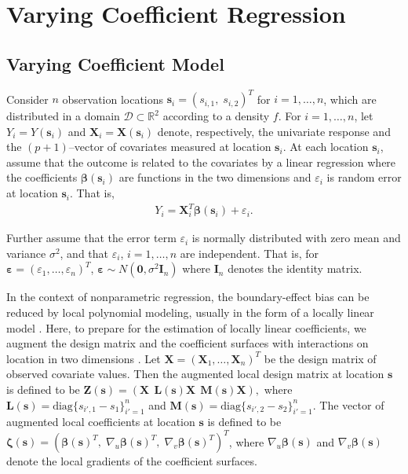 \documentclass[authoryear,review, 12pt]{elsarticle}
\begin{document}
\section{Varying Coefficient Regression\label{sec:vcr}}

\subsection{Varying Coefficient Model}

Consider $n$ observation locations $\bm{s}_{i}=(s_{i,1},\; s_{i,2})^{T}$
for $i=1,\dots,n$, which are distributed in a domain $\mathcal{D}\subset\mathbb{R}^{2}$
according to a density $f$. For $i=1,\dots,n$, let $Y_{i}=Y(\bm{s}_{i})$
and $\bm{X}_{i}=\bm{X}(\bm{s}_{i})$ denote, respectively, the univariate
response and the $(p+1)$--vector of covariates measured at location
$\bm{s}_{i}$. At each location $\bm{s}_{i}$, assume that the outcome
is related to the covariates by a linear regression where the coefficients
$\bm{\beta}(\bm{s}_{i})$ are functions in the two dimensions and
$\varepsilon_{i}$ is random error at location $\bm{s}_{i}$. That
is, 
\begin{align}
Y_{i}=\bm{X}_{i}^{T}\bm{\beta}(\bm{s}_{i})+\varepsilon_{i}.\label{eq:lm(s)}
\end{align}

Further assume that the error term $\varepsilon_{i}$ is normally
distributed with zero mean and variance $\sigma^{2}$, and that $\varepsilon_{i}$,
$i=1,\dots,n$ are independent. That is, for $\bm{\varepsilon}=\left(\varepsilon_{1},\dots,\varepsilon_{n}\right)^{T}$,
$\bm{\varepsilon}\sim N\left(\bm{0},\sigma^{2}\bm{I}_{n}\right)$
where $\bm{I}_{n}$ denotes the identity matrix. 

In the context of nonparametric regression, the boundary-effect bias
can be reduced by local polynomial modeling, usually in the form of
a locally linear model \citep{Fan-Gijbels-1996}. Here, to prepare
for the estimation of locally linear coefficients, we augment the
design matrix and the coefficient surfaces with interactions on location in two dimensions
\citep{Wang-2008b}. Let $\bm{X}=\left(\bm{X}_{1},\dots,\bm{X}_{n}\right)^{T}$
be the design matrix of observed covariate values. Then the augmented
local design matrix at location $\bm{s}$ is defined to be $\bm{Z}(\bm{s})=\left(\bm{X}\ \:\bm{L}(\bm{s}) \bm{X}\ \:\bm{M}(\bm{s}) \bm{X}\right),$
where $\bm{L}(\bm{s})=\text{diag}\{s_{i',1}-s_1\}_{i'=1}^{n}$ and
$\bm{M}(\bm{s})=\text{diag}\{s_{i',2}-s_2\}_{i'=1}^{n}$. 
The vector of augmented local coefficients at location $\bm{s}$ is defined to be $\bm{\zeta}(\bm{s})=\left(\bm{\beta}(\bm{s})^{T},\;\nabla_{u}\bm{\beta}(\bm{s})^{T},\;\nabla_{v}\bm{\beta}(\bm{s})^{T}\right)^{T}$,
where $\nabla_{u}\bm{\beta}(\bm{s})$ and $\nabla_{v}\bm{\beta}(\bm{s})$ denote the local gradients 
of the coefficient surfaces.
\end{document}
